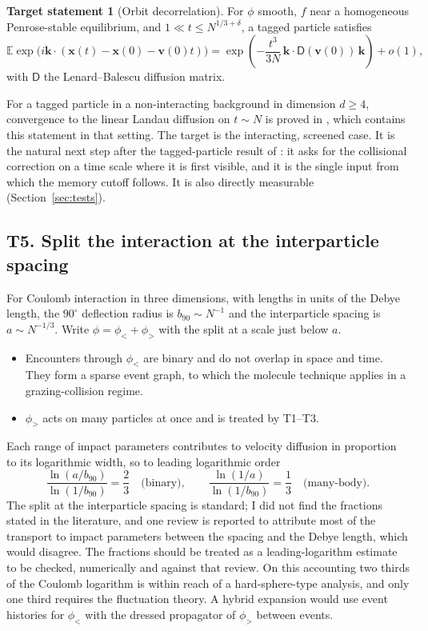 \documentclass[11pt]{article}
\newcommand{\bx}{\mathbf{x}}
\newcommand{\bv}{\mathbf{v}}
\newcommand{\bk}{\mathbf{k}}
\theoremstyle{definition}
\newtheorem{target}{Target statement}
\begin{document}
\begin{target}[Orbit decorrelation]
For $\phi$ smooth, $f$ near a homogeneous Penrose-stable equilibrium, and
$1\ll t\le N^{1/3+\delta}$, a tagged particle satisfies
\[
  \mathbb{E}\exp\bigl(i\bk\cdot(\bx(t) - \bx(0) - \bv(0)t)\bigr)
  = \exp\!\left(-\frac{t^3}{3N}\,\bk\cdot\mathsf{D}(\bv(0))\,\bk\right)
    + o(1),
\]
with $\mathsf{D}$ the Lenard--Balescu diffusion matrix.
\end{target}

For a tagged particle in a non-interacting background in dimension
$d\ge 4$, convergence to the linear Landau diffusion on $t\sim N$ is proved
in \cite{BodineauLeBris}, which contains this statement in that setting. The
target is the interacting, screened case. It is the natural next step after
the tagged-particle result of \cite{DuerinckxSR}: it asks for the collisional correction on a time scale
where it is first visible, and it is the single input from which the memory
cutoff follows. It is also directly measurable (Section~\ref{sec:tests}).

\subsection{T5. Split the interaction at the interparticle spacing}

For Coulomb interaction in three dimensions, with lengths in units of the
Debye length, the $90^\circ$ deflection radius is $b_{90}\sim N^{-1}$ and the
interparticle spacing is $a\sim N^{-1/3}$. Write
$\phi = \phi_< + \phi_>$ with the split at a scale just below $a$.
\begin{itemize}
  \item Encounters through $\phi_<$ are binary and do not overlap in space
    and time. They form a sparse event graph, to which the molecule
    technique applies in a grazing-collision regime.
  \item $\phi_>$ acts on many particles at once and is treated by T1--T3.
\end{itemize}
Each range of impact parameters contributes to velocity diffusion in
proportion to its logarithmic width, so to leading logarithmic order
\begin{equation}
  \frac{\ln(a/b_{90})}{\ln(1/b_{90})} = \frac{2}{3}
  \quad\text{(binary)},
  \qquad
  \frac{\ln(1/a)}{\ln(1/b_{90})} = \frac{1}{3}
  \quad\text{(many-body)} .
\end{equation}
The split at the interparticle spacing is standard; I did not find the
fractions stated in the literature, and one review is reported to attribute
most of the transport to impact parameters between the spacing and the Debye
length, which would disagree. The fractions should be treated as a
leading-logarithm estimate to be checked, numerically and against that
review. On this accounting two thirds of the Coulomb logarithm is within
reach of a hard-sphere-type analysis, and only one third requires the fluctuation
theory. A hybrid expansion would use event histories for $\phi_<$ with the
dressed propagator of $\phi_>$ between events.
\end{document}
